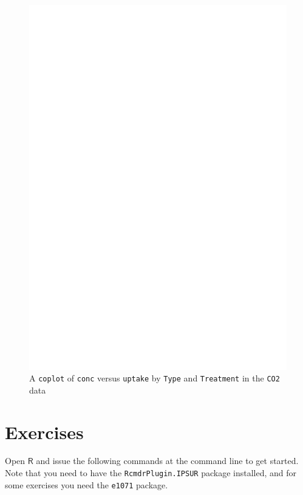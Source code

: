 \documentclass[captions=tableheading]{scrbook}
\begin{document}
\begin{figure}[th]
  \includegraphics[angle=270, totalheight=4in]{ps/coplot.ps}
  \caption[A \texttt{coplot} of \texttt{conc} versus \texttt{uptake} by \texttt{Type} and \texttt{Treatment}]{A \texttt{coplot} of \texttt{conc} versus \texttt{uptake} by \texttt{Type} and \texttt{Treatment} in the \texttt{CO2} data}
  \label{fig:coplot}
\end{figure}



\newpage{}
\section{Exercises}
\label{sec-2-7}

\setcounter{thm}{0}

Open \(\mathsf{R}\) and issue the following commands at the command line to get started. Note that you need to have the \texttt{RcmdrPlugin.IPSUR} package installed, and for some exercises you need the \texttt{e1071} package.
\end{document}

